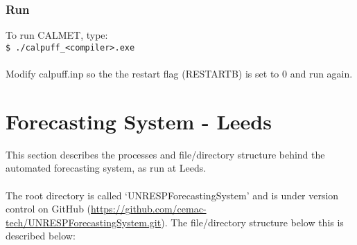 \documentclass[10pt,a4paper]{article}
\newcommand\tab[1][0.5cm]{\hspace*{#1}}
\begin{document}
\begin{itemize}
\begin{itemize}
\end{itemize}
\end{itemize}

\subsubsection{Run}
To run CALMET, type:\\
\tab \texttt{\$ ./calpuff\_<compiler>.exe}\\\\
Modify calpuff.inp so the the restart flag (RESTARTB) is set to 0 and run again.

\section{Forecasting System - Leeds}
This section describes the processes and file/directory structure behind the automated forecasting system, as run at Leeds.\\\\
The root directory is called `UNRESPForecastingSystem' and is under version control on GitHub (\url{https://github.com/cemac-tech/UNRESPForecastingSystem.git}). The file/directory structure below this is described below:
\end{document}
